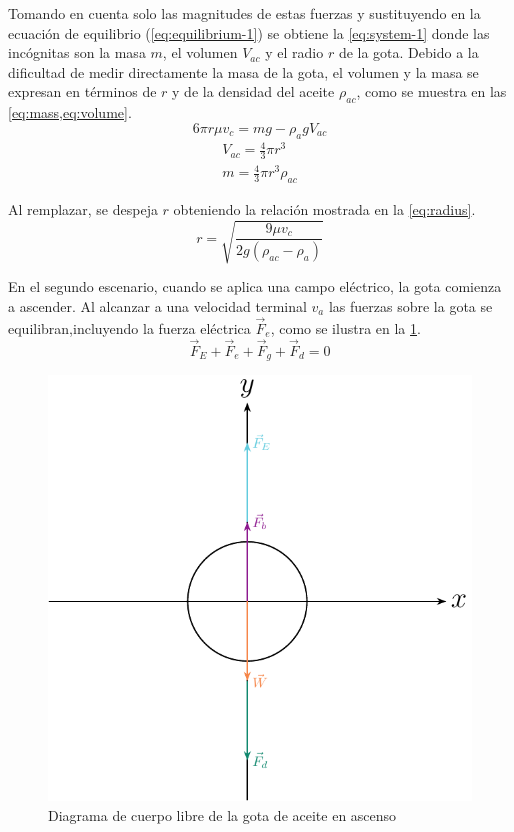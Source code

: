 Tomando en cuenta solo las magnitudes de estas fuerzas y sustituyendo en la
ecuación de equilibrio (\cref{eq:equilibrium-1}) se obtiene la \cref{eq:system-1}
donde las incógnitas son la masa \(m\), el volumen \(V_{ac}\) y el radio \(r\)
de la gota.
Debido a la dificultad de medir directamente la masa de la gota, el volumen y la
masa se expresan en términos de \(r\) y de la densidad del aceite \(\rho_{ac}\),
como se muestra en las \cref{eq:mass,eq:volume}.
\begin{equation}\label{eq:system-1}
    6\pi r\mu v_c = mg - \rho_a g V_{ac}
\end{equation}
\begin{align}
    V_{ac} = \frac{4}{3}\pi r^3 \label{eq:volume} \\
    m = \frac{4}{3}\pi r^3\rho_{ac} \label{eq:mass}
\end{align}

Al remplazar, se despeja \( r \) obteniendo la relación mostrada en la
\cref{eq:radius}.
\begin{equation}\label{eq:radius}
    r = \sqrt{\frac{9\mu v_c}{2g(\rho_{ac}-\rho_a)}}
\end{equation}

En el segundo escenario, cuando se aplica una campo eléctrico, la gota comienza
a ascender.
Al alcanzar a una velocidad terminal $v_a$ las fuerzas sobre la gota se
equilibran,incluyendo la fuerza eléctrica \(\vec{F}_e\), como se ilustra en la
\cref{fig:fbd-ascending-drop}.
\begin{equation}
    \vec{F}_E + \vec{F}_e + \vec{F}_g + \vec{F}_d = 0
\end{equation}

\begin{figure}[htbp!]
    \centering
    \includegraphics[width=0.8\linewidth]{./images/free-body-diagram-ascending.pdf}
    \caption{Diagrama de cuerpo libre de la gota de aceite en ascenso}
    \label{fig:fbd-ascending-drop}
\end{figure}

